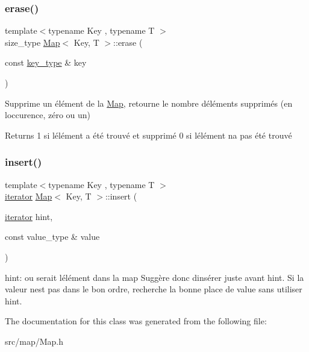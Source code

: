 \subsubsection{\texorpdfstring{erase()}{erase()}}
{\footnotesize\ttfamily template$<$typename Key , typename T $>$ \\
size\+\_\+type \hyperlink{classMap}{Map}$<$ Key, T $>$\+::erase (\begin{DoxyParamCaption}\item[{const \hyperlink{classMap_a430e42d1c6a02e95eb3a34626e313441}{key\+\_\+type} \&}]{key }\end{DoxyParamCaption})}

Supprime un élément de la \hyperlink{classMap}{Map}, retourne le nombre d\textquotesingle{}éléments supprimés (en l\textquotesingle{}occurence, zéro ou un) \begin{DoxyReturn}{Returns}
1 si l\textquotesingle{}élément a été trouvé et supprimé 0 si l\textquotesingle{}élément n\textquotesingle{}a pas été trouvé 
\end{DoxyReturn}
\mbox{\label{classMap_a7ee01410e4c4ed9e8e678cc3b714f59f}} 
\subsubsection{\texorpdfstring{insert()}{insert()}}
{\footnotesize\ttfamily template$<$typename Key , typename T $>$ \\
\hyperlink{classMapIterator}{iterator} \hyperlink{classMap}{Map}$<$ Key, T $>$\+::insert (\begin{DoxyParamCaption}\item[{\hyperlink{classMapIterator}{iterator}}]{hint,  }\item[{const value\+\_\+type \&}]{value }\end{DoxyParamCaption})}

hint\+: ou serait l\textquotesingle{}élément dans la map Suggère donc d\textquotesingle{}insérer juste avant hint. Si la valeur n\textquotesingle{}est pas dans le bon ordre, recherche la bonne place de value sans utiliser hint. 

The documentation for this class was generated from the following file\+:\begin{DoxyCompactItemize}
\item 
src/map/Map.\+h\end{DoxyCompactItemize}
